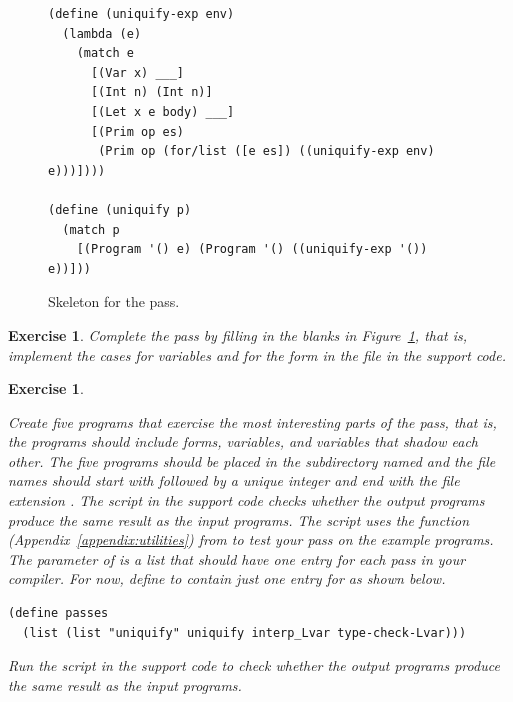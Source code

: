 \documentclass[7x10,nocrop]{TimesAPriori_MIT}%
\newtheorem{exercise}[theorem]{Exercise}
\begin{document}
{\begin{figure}[tbp]
\begin{lstlisting}
(define (uniquify-exp env)
  (lambda (e)
    (match e
      [(Var x) ___]
      [(Int n) (Int n)]
      [(Let x e body) ___]
      [(Prim op es)
       (Prim op (for/list ([e es]) ((uniquify-exp env) e)))])))

(define (uniquify p)
  (match p
    [(Program '() e) (Program '() ((uniquify-exp '()) e))]))
\end{lstlisting}
\caption{Skeleton for the  pass.}
\label{fig:uniquify-Lvar}
\end{figure}

\begin{exercise}
\normalfont %

Complete the  pass by filling in the blanks in
Figure~\ref{fig:uniquify-Lvar}, that is, implement the cases for
variables and for the  form in the file 
in the support code.
\end{exercise}

\begin{exercise}
\normalfont %
\label{ex:Lvar}

Create five \LangVar{} programs that exercise the most interesting
parts of the  pass, that is, the programs should include
 forms, variables, and variables that shadow each other.
The five programs should be placed in the subdirectory named
 and the file names should start with 
followed by a unique integer and end with the file extension
.
%
The  script in the support code checks whether the
output programs produce the same result as the input programs.  The
script uses the  function
(Appendix~\ref{appendix:utilities}) from  to test
your  pass on the example programs.  The 
parameter of  is a list that should have one entry
for each pass in your compiler.  For now, define  to
contain just one entry for  as shown below.
\begin{lstlisting}
(define passes 
  (list (list "uniquify" uniquify interp_Lvar type-check-Lvar)))
\end{lstlisting}
Run the  script in the support code to check
whether the output programs produce the same result as the input
programs.
\end{exercise}

\fi}
\end{document}
